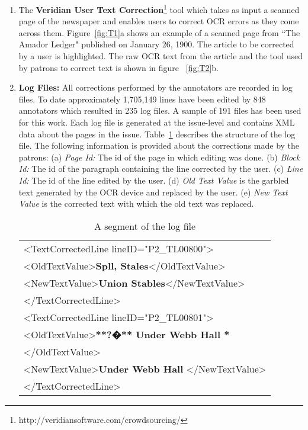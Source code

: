 \documentclass{sig-alternate}
\begin{document}
\begin{enumerate}

\item The \textbf{Veridian User Text Correction}\footnote{http://veridiansoftware.com/crowdsourcing/} tool which takes as input a scanned page of the newspaper and enables users to correct OCR errors as they come across them.
Figure~\ref{fig:T1}a shows an example of a scanned page from ``The Amador Ledger" published on January 26, 1900. The article to be corrected by a user is highlighted. The raw OCR text from the article and the tool used by patrons to correct text is shown in figure ~\ref{fig:T2}b.


\item \textbf{Log Files: }All corrections performed by the annotators are recorded in log files. To date approximately 1,705,149 lines have been edited by 848 annotators which resulted in 235 log files. A sample of 191 files has been used for this work. Each log file is generated at the issue-level and contains XML data about the pages in the issue. Table~\ref{table:logfile} describes the structure of the log file. The following information is provided about the corrections made by the patrons:
(a) \textit{Page Id: } The id of the page in which editing was done.
(b) \textit{Block Id: } The id of the paragraph containing the line corrected by the user.
(c) \textit{Line Id: }The id of the line edited by the user.
(d) \textit{Old Text Value} is the garbled text generated by the OCR device and replaced by the user.
(e) \textit{New Text Value} is the corrected text with which the old text was replaced.

\begin{table}[h]
\begin{center}
\begin{tabular}{l}
\textless TextCorrectedLine lineID="P2\_TL00800"\textgreater \\
\textless OldTextValue\textgreater \textbf{Spll, Stales}\textless /OldTextValue\textgreater \\
\textless NewTextValue\textgreater \textbf{Union Stables}\textless /NewTextValue\textgreater \\
\textless /TextCorrectedLine\textgreater \\
\textless TextCorrectedLine lineID="P2\_TL00801"\textgreater \\
\textless OldTextValue\textgreater \textbf{**?�** Under Webb Hall *}\\
\textless/OldTextValue\textgreater \\
\textless NewTextValue\textgreater \textbf{Under Webb Hall} \textless/NewTextValue\textgreater \\
\textless /TextCorrectedLine\textgreater \\
\end{tabular}
\end{center}
\caption{A segment of the log file}
\label{table:logfile}
\end{table}


\end{enumerate}
\end{document}
